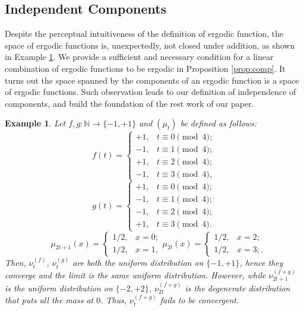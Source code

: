 \documentclass[twoside]{article}
\renewcommand{\natural}{\mathbb{N}}
\newtheorem{example}[lemma]{Example}
\theoremstyle{definition}
\begin{document}
\subsection{Independent Components}
\label{subsec:IndeComp}
Despite the perceptual intuitiveness of the definition of ergodic function, the space of ergodic functions is, unexpectedly, not closed under addition, as shown in Example \ref{eg:ergodic}. 
We provide a sufficient and necessary condition for a linear combination 
of ergodic functions to be ergodic in Proposition \ref{prop:comp}. 
It turns out the space spanned by the components of an ergodic function is a space of ergodic functions.
Such observation leads to our definition of independence of components, and build the foundation of the rest work of our paper.
\begin{example}
\label{eg:ergodic}
Let $f,g:\natural \rightarrow \{-1,+1\}$ and $(\mu_t)$ be defined as follows: 
\[
f(t) = \begin{cases} +1, & t \equiv 0 \pmod 4; \\
					-1, & t \equiv 1 \pmod 4; \\
					+1,  & t \equiv 2  \pmod 4; \\
					-1, & t \equiv 3  \pmod 4,
					\end{cases}
					\]\[
g(t) = \begin{cases} +1, & t\equiv 0 \pmod 4; \\
					-1, & t\equiv 1 \pmod 4; \\
					-1,  & t\equiv 2 \pmod 4; \\
					+1, & t\equiv 3 \pmod 4.
					\end{cases}
\]
\[
\quad \mu_{2t+1}(x) = \begin{cases} 1/2, & x=0; \\
					1/2, & x=1, 
					\end{cases}
\mu_{2t}(x) = \begin{cases} 1/2, & x=2; \\
					1/2, & x=3;.
					\end{cases}
\]
Then, $\nu^{(f)}_t$, $\nu^{(g)}_t$ are both the uniform  distribution on $\{-1,+1\}$, hence they converge and the limit is the same uniform  distribution. 
However, while $\nu^{(f+g)}_{2t+1}$ is the uniform  distribution on $\{-2,+2\}$,  $\nu^{(f+g)}_{2t}$ is the degenerate
distribution that puts all the mass at $0$. Thus, $\nu^{(f+g)}_{t}$ fails to be convergent. 
\end{example}
\end{document}
